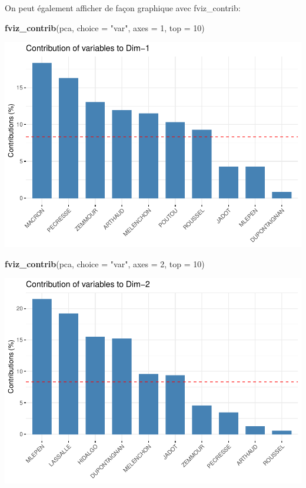 \documentclass[
]{book}
\newenvironment{Shaded}{\begin{snugshade}}{\end{snugshade}}
\newcommand{\AttributeTok}[1]{\textcolor[rgb]{0.13,0.29,0.53}{#1}}
\newcommand{\DecValTok}[1]{\textcolor[rgb]{0.00,0.00,0.81}{#1}}
\newcommand{\FunctionTok}[1]{\textcolor[rgb]{0.13,0.29,0.53}{\textbf{#1}}}
\newcommand{\NormalTok}[1]{#1}
\newcommand{\StringTok}[1]{\textcolor[rgb]{0.31,0.60,0.02}{#1}}
\begin{document}
On peut également afficher de façon graphique avec fviz\_contrib:

\begin{Shaded}
\begin{Highlighting}[]
\FunctionTok{fviz\_contrib}\NormalTok{(pca, }\AttributeTok{choice =} \StringTok{"var"}\NormalTok{, }\AttributeTok{axes =} \DecValTok{1}\NormalTok{, }\AttributeTok{top =} \DecValTok{10}\NormalTok{)}
\end{Highlighting}
\end{Shaded}

\includegraphics{manuel_geo_quanti_files/figure-latex/unnamed-chunk-69-1.pdf}

\begin{Shaded}
\begin{Highlighting}[]
\FunctionTok{fviz\_contrib}\NormalTok{(pca, }\AttributeTok{choice =} \StringTok{"var"}\NormalTok{, }\AttributeTok{axes =} \DecValTok{2}\NormalTok{, }\AttributeTok{top =} \DecValTok{10}\NormalTok{)}
\end{Highlighting}
\end{Shaded}

\includegraphics{manuel_geo_quanti_files/figure-latex/unnamed-chunk-69-2.pdf}
\end{document}
